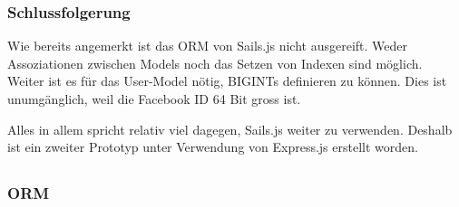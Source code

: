 \subsubsection*{Schlussfolgerung}

Wie bereits angemerkt ist das ORM von Sails.js nicht ausgereift. Weder Assoziationen zwischen Models noch das Setzen von Indexen sind möglich.\\
Weiter ist es für das User-Model nötig, BIGINTs definieren zu können. Dies ist unumgänglich, weil die Facebook ID 64 Bit gross ist.

Alles in allem spricht relativ viel dagegen, Sails.js weiter zu verwenden. Deshalb ist ein zweiter Prototyp unter Verwendung von Express.js erstellt worden.

\subsection*{\cite{Expressjs}}

\subsubsection*{\gls{ORM}}
